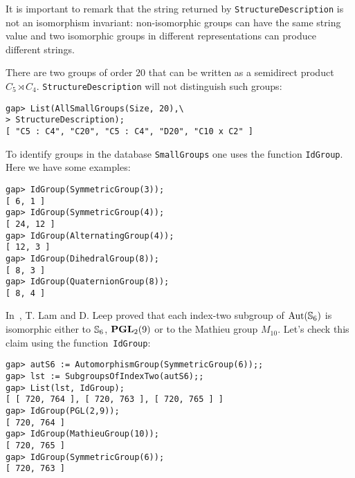 It is important to remark that the string
returned by \lstinline{StructureDescription} is not an isomorphism invariant:
non-isomorphic groups can have the same string value and two isomorphic groups
in different representations can produce different strings. 

\begin{example}
There are two groups of order $20$ that can be written as 
a semidirect product $C_5\rtimes C_4$. 
\lstinline{StructureDescription} will not distinguish such groups:
\begin{lstlisting}
gap> List(AllSmallGroups(Size, 20),\
> StructureDescription);
[ "C5 : C4", "C20", "C5 : C4", "D20", "C10 x C2" ]
\end{lstlisting}
To identify groups in the database \lstinline{SmallGroups} one uses the
function \lstinline{IdGroup}. Here we have some examples:
\begin{lstlisting}
gap> IdGroup(SymmetricGroup(3));
[ 6, 1 ]
gap> IdGroup(SymmetricGroup(4));
[ 24, 12 ]
gap> IdGroup(AlternatingGroup(4));
[ 12, 3 ]
gap> IdGroup(DihedralGroup(8));
[ 8, 3 ]
gap> IdGroup(QuaternionGroup(8));
[ 8, 4 ]
\end{lstlisting}
\end{example}

\begin{example}
	In~\cite{MR1240362}, T. Lam and D. Leep proved that each index-two subgroup of
	$\operatorname{Aut}(\mathbb{S}_6)$ is isomorphic either to $\mathbb{S}_6$, $\mathbf{PGL}_2(9)$ or to the Mathieu group
	$M_{10}$. Let's check this claim using the function~\lstinline{IdGroup}:
	\begin{lstlisting}
gap> autS6 := AutomorphismGroup(SymmetricGroup(6));;
gap> lst := SubgroupsOfIndexTwo(autS6);;
gap> List(lst, IdGroup);
[ [ 720, 764 ], [ 720, 763 ], [ 720, 765 ] ]
gap> IdGroup(PGL(2,9));
[ 720, 764 ]
gap> IdGroup(MathieuGroup(10));
[ 720, 765 ]
gap> IdGroup(SymmetricGroup(6));
[ 720, 763 ]
\end{lstlisting}
\end{example}

